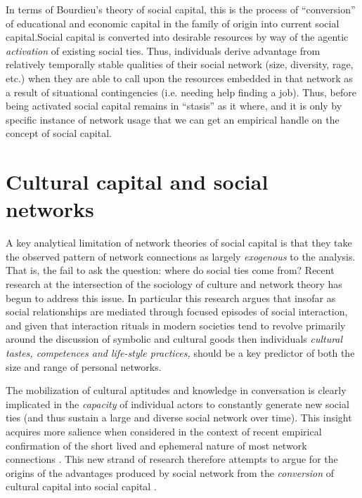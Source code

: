 \documentclass[12pt]{article}
\begin{document}
In terms of Bourdieu's \citeyearpar{bourdieu86} theory of social capital, this is the process of ``conversion'' of educational and economic capital in the family of origin into current social capital.Social capital is converted into desirable resources by way of the agentic \emph{activation } of existing social ties. Thus, individuals derive advantage from relatively temporally stable qualities of their social network (size, diversity, rage, etc.) when they are able to call upon the resources embedded in that network as a result of situational contingencies (i.e. needing help finding a job). Thus, before being activated social capital remains in ``stasis'' as it where, and it is only by specific instance of network usage that we can get an empirical handle on the concept of social capital.

\section{Cultural capital and social networks}
A key analytical limitation of network theories of social capital is that they take the observed pattern of network connections as largely \emph{exogenous} to the analysis. That is, the fail to ask the question: where do social ties come from? Recent research at the intersection of the sociology of culture and network theory has begun to address this issue. In particular this research argues that insofar as social relationships are mediated through focused episodes of social interaction, and given that interaction rituals in modern societies tend to revolve primarily around the discussion of symbolic and cultural goods \citep{dimaggio87, dimaggio00} then individuals \emph{cultural tastes, competences and life-style practices,} should be a key predictor of both the size and range of personal networks.

The mobilization of cultural aptitudes and knowledge in conversation is clearly implicated in the \emph{capacity }of individual actors to constantly generate new social ties (and thus sustain a large and diverse social network over time). This insight acquires more salience when considered in the context of recent empirical confirmation of the short lived and ephemeral nature of most network connections \citep{bidart_degenne05, bidart_lavenu05, burt00, burt02, suitor_etal97, suitor_keeton97, feld_etal07}. This new strand of research therefore attempts to argue for the origins of the advantages produced by social network from the \emph{conversion} of cultural capital into social capital \citep{bourdieu86}. 
\end{document}
